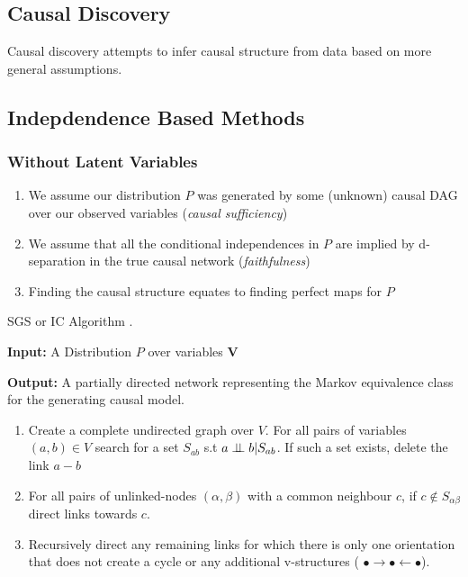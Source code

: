 \documentclass[a0,landscape,25pt,plainsections]{sciposter}
\begin{document}
\begin{multicols}{5}
\columnbreak
\section*{Causal Discovery}

Causal discovery attempts to infer causal structure from data based on more general assumptions. 

\subsection*{Indepdendence Based Methods}
\subsubsection*{Without Latent Variables}
\begin{enumerate}
\item We assume our distribution $P$ was generated by some (unknown) causal DAG over our observed variables (\emph{causal sufficiency}) 
\item We assume that all the conditional independences in $P$ are implied by d-separation in the true causal network (\emph{faithfulness}) 
\item Finding the causal structure equates to finding perfect maps for $P$
\end{enumerate}

\begin{algorithm}
\caption{SGS or IC Algorithm \cite{Sprites,Pearl2000}. \label{alg:spect}}
\textbf{Input:} A Distribution $P$ over variables $\boldsymbol{V}$

\textbf{Output:} A partially directed network representing the Markov equivalence class for the generating causal model.
\begin{enumerate}
\item Create a complete undirected graph over $V$. For all pairs of variables $(a,b) \in V$ search for a set $S_{ab}$ s.t $a \perp\!\!\!\perp b|S_{ab}$. If such a set exists, delete the link $a-b$
\item For all pairs of unlinked-nodes $(\alpha, \beta)$ with a common neighbour $c$, if $c \notin S_{\alpha \beta}$ direct links towards $c$.
\item Recursively direct any remaining links for which there is only one orientation that does not create a cycle or any additional v-structures ( $\bullet \rightarrow \bullet \leftarrow \bullet$). 
\end{enumerate}
\end{algorithm}


\end{multicols}
\end{document}
